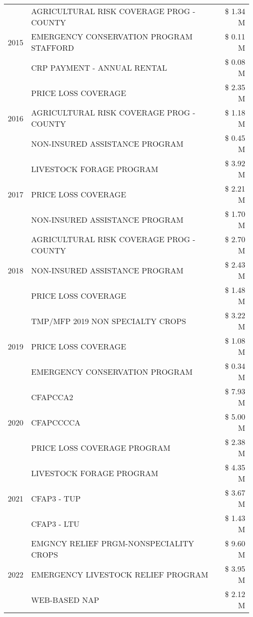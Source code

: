 \begin{tabular}{llr}
\cline{1-3}
\multirow[t]{3}{*}{2015} & AGRICULTURAL RISK COVERAGE PROG - COUNTY & \$ 1.34 M \\
 & EMERGENCY CONSERVATION PROGRAM STAFFORD & \$ 0.11 M \\
 & CRP PAYMENT - ANNUAL RENTAL & \$ 0.08 M \\
\cline{1-3}
\multirow[t]{3}{*}{2016} & PRICE LOSS COVERAGE & \$ 2.35 M \\
 & AGRICULTURAL RISK COVERAGE PROG - COUNTY & \$ 1.18 M \\
 & NON-INSURED ASSISTANCE PROGRAM & \$ 0.45 M \\
\cline{1-3}
\multirow[t]{3}{*}{2017} & LIVESTOCK FORAGE PROGRAM & \$ 3.92 M \\
 & PRICE LOSS COVERAGE & \$ 2.21 M \\
 & NON-INSURED ASSISTANCE PROGRAM & \$ 1.70 M \\
\cline{1-3}
\multirow[t]{3}{*}{2018} & AGRICULTURAL RISK COVERAGE PROG - COUNTY & \$ 2.70 M \\
 & NON-INSURED ASSISTANCE PROGRAM & \$ 2.43 M \\
 & PRICE LOSS COVERAGE & \$ 1.48 M \\
\cline{1-3}
\multirow[t]{3}{*}{2019} & TMP/MFP 2019 NON SPECIALTY CROPS & \$ 3.22 M \\
 & PRICE LOSS COVERAGE & \$ 1.08 M \\
 & EMERGENCY CONSERVATION PROGRAM & \$ 0.34 M \\
\cline{1-3}
\multirow[t]{3}{*}{2020} & CFAPCCA2 & \$ 7.93 M \\
 & CFAPCCCCA & \$ 5.00 M \\
 & PRICE LOSS COVERAGE PROGRAM & \$ 2.38 M \\
\cline{1-3}
\multirow[t]{3}{*}{2021} & LIVESTOCK FORAGE PROGRAM & \$ 4.35 M \\
 & CFAP3 - TUP & \$ 3.67 M \\
 & CFAP3 - LTU & \$ 1.43 M \\
\cline{1-3}
\multirow[t]{3}{*}{2022} & EMGNCY RELIEF PRGM-NONSPECIALITY CROPS & \$ 9.60 M \\
 & EMERGENCY LIVESTOCK RELIEF PROGRAM & \$ 3.95 M \\
 & WEB-BASED NAP & \$ 2.12 M \\
\cline{1-3}
\bottomrule
\end{tabular}
